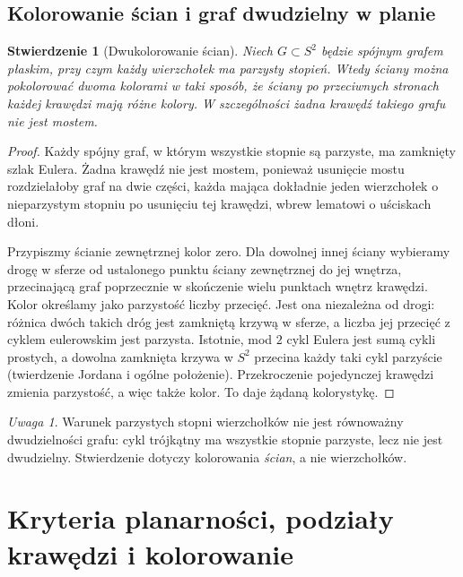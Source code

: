 \documentclass[11pt,a4paper]{report}
\numberwithin{equation}{section}
\theoremstyle{plain}
\newtheorem{stwierdzenie}[twierdzenie]{Stwierdzenie}
\theoremstyle{definition}
\theoremstyle{remark}
\newtheorem{uwaga}[twierdzenie]{Uwaga}
\begin{document}
\section{Kolorowanie ścian i graf dwudzielny w planie}
\label{sec:tg-planarne-color}

\begin{stwierdzenie}[Dwukolorowanie ścian]
Niech $G\subset S^2$ będzie spójnym grafem płaskim,
przy czym każdy wierzchołek ma parzysty stopień.
Wtedy ściany można pokolorować dwoma kolorami w taki sposób,
że ściany po przeciwnych stronach każdej krawędzi mają różne kolory.
W szczególności żadna krawędź takiego grafu nie jest mostem.
\end{stwierdzenie}

\begin{proof}
Każdy spójny graf, w którym wszystkie stopnie są parzyste,
ma zamknięty szlak Eulera. Żadna krawędź nie jest mostem,
ponieważ usunięcie mostu rozdzielałoby graf na dwie części,
każda mająca dokładnie jeden wierzchołek o nieparzystym stopniu
po usunięciu tej krawędzi, wbrew lematowi o uściskach dłoni.

Przypiszmy ścianie zewnętrznej kolor zero.
Dla dowolnej innej ściany wybieramy drogę w sferze
od ustalonego punktu ściany zewnętrznej do jej wnętrza,
przecinającą graf poprzecznie w skończenie wielu punktach
wnętrz krawędzi. Kolor określamy jako parzystość liczby
przecięć. Jest ona niezależna od drogi: różnica dwóch
takich dróg jest zamkniętą krzywą w sferze, a liczba
jej przecięć z cyklem eulerowskim jest parzysta.
Istotnie, mod $2$ cykl Eulera jest sumą cykli prostych,
a dowolna zamknięta krzywa w $S^2$ przecina każdy taki
cykl parzyście (twierdzenie Jordana i ogólne położenie).
Przekroczenie pojedynczej krawędzi zmienia parzystość,
a więc także kolor. To daje żądaną kolorystykę.
\end{proof}

\begin{uwaga}
Warunek parzystych stopni wierzchołków nie jest równoważny
dwudzielności grafu: cykl trójkątny ma wszystkie stopnie
parzyste, lecz nie jest dwudzielny. Stwierdzenie dotyczy
kolorowania \emph{ścian}, a nie wierzchołków.
\end{uwaga}


\chapter{Kryteria planarności, podziały krawędzi i kolorowanie}
\label{ch:tg-kuratowski}
\end{document}
